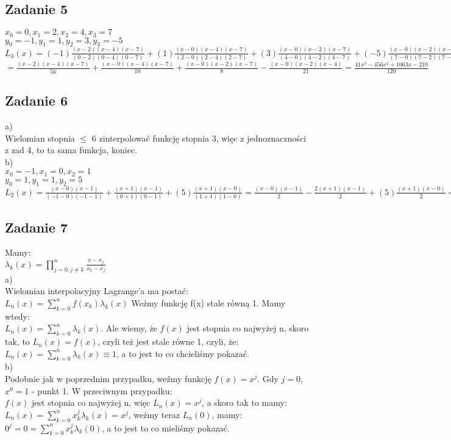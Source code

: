 \documentclass[a4paper]{article}
\begin{document}
\subsection*{Zadanie 5}
$x_0=0, x_1=2, x_2=4, x_3=7$\\
$y_0=-1, y_1=1, y_2=3, y_3=-5$\\
\Large
$L_3(x)=(-1)\frac{(x-2)(x-4)(x-7)}{(0-2)(0-4)(0-7)}+(1)\frac{(x-0)(x-4)(x-7)}{(2-0)(2-4)(2-7)}+(3)\frac{(x-0)(x-2)(x-7)}{(4-0)(4-2)(4-7)}+(-5)\frac{(x-0)(x-2)(x-4)}{(7-0)(7-2)(7-4)}=$\\
$=\frac{(x-2)(x-4)(x-7)}{56}+\frac{(x-0)(x-4)(x-7)}{10}+\frac{(x-0)(x-2)(x-7)}{8}-\frac{(x-0)(x-2)(x-4)}{21}=\frac{41x^3-456x^2+1063x-210}{120}$
\normalsize

\subsection*{Zadanie 6}
a)\\
Wielomian stopnia $\leq$ 6 zinterpolować funkcję stopnia 3, więc z jednoznaczności z zad 4, to ta sama funkcja, koniec.\\
b)\\
$x_0=-1, x_1=0, x_2=1$\\
$y_0=1, y_1=1, y_2=5$\\
\Large
$L_2(x)=\frac{(x-0)(x-1)}{(-1-0)(-1-1)}+\frac{(x+1)(x-1)}{(0+1)(0-1)}+(5)\frac{(x+1)(x-0)}{(1+1)(1-0)}=\frac{(x-0)(x-1)}{2}-\frac{2(x+1)(x-1)}{2}+(5)\frac{(x+1)(x-0)}{2}=2x^2+2x+1$
\normalsize
 
\clearpage 
\subsection*{Zadanie 7}
Mamy:\\
\Large$\lambda_k(x)=\prod\limits_{j=0, j \neq k}^n\frac{x-x_j}{x_k-x_j}$\\ \normalsize
a)\\
Wielomian interpolacyjny Lagrange'a ma postać:\\
$L_n(x)=\sum\limits_{k=0}^n f(x_k)\lambda_k(x)$ Weźmy funkcję f(x) stale równą 1. Mamy wtedy:\\
$L_n(x)=\sum\limits_{k=0}^n \lambda_k(x)$. Ale wiemy, że $f(x)$ jest stopnia co najwyżej n, skoro tak, to $L_n(x)=f(x)$, czyli też jest stale równe 1, czyli, że:\\
$L_n(x)=\sum\limits_{k=0}^n \lambda_k(x) \equiv 1$, a to jest to co chcieliśmy pokazać.\\
b)\\
Podobnie jak w poprzednim przypadku, weźmy funkcję $f(x)=x^j$. Gdy $j=0$, $x^0=1$ - punkt 1. W przeciwnym przypadku:\\
$f(x)$ jest stopnia co najwyżej n, więc $L_n(x)=x^j$, a skoro tak to mamy:\\
$L_n(x)=\sum\limits_{k=0}^n x_k^j \lambda_k(x) = x^j$, weźmy teraz $L_n(0)$, mamy:\\
$0^j=0=\sum\limits_{k=0}^n x_k^j \lambda_k(0)$, a to jest to co mieliśmy pokazać. 
\end{document}
